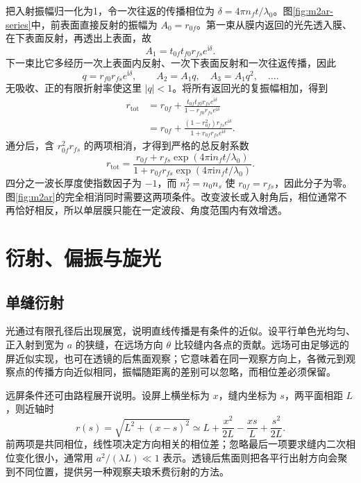 把入射振幅归一化为1，令一次往返的传播相位为
\(\delta=4\pi n_ft/\lambda_0\)。图\ref{fig:m2ar-series}中，前表面直接反射的振幅为
\(A_0=r_{0f}\)。第一束从膜内返回的光先透入膜、在下表面反射，再透出上表面，故
\[
 A_1=t_{0f}t_{f0}r_{fs}e^{\mathrm i\delta}.
\]
下一束比它多经历一次上表面内反射、一次下表面反射和一次往返传播，因此
\[
 q=r_{f0}r_{fs}e^{\mathrm i\delta},\qquad
 A_2=A_1q,\quad A_3=A_1q^2,\quad\ldots.
\]
无吸收、正的有限折射率使这里 \(|q|<1\)。将所有返回光的复振幅相加，得到
\begin{align*}
 r_{\mathrm{tot}}&=r_{0f}+\frac{t_{0f}t_{f0}r_{fs}e^{\mathrm i\delta}}
 {1-r_{f0}r_{fs}e^{\mathrm i\delta}}\\
 &=r_{0f}+\frac{(1-r_{0f}^2)r_{fs}e^{\mathrm i\delta}}
 {1+r_{0f}r_{fs}e^{\mathrm i\delta}}.
\end{align*}
通分后，含 \(r_{0f}^2r_{fs}\) 的两项相消，才得到严格的总反射系数
\[
 r_{\mathrm{tot}}=
 \frac{r_{0f}+r_{fs}\exp(4\pi\mathrm i n_ft/\lambda_0)}
 {1+r_{0f}r_{fs}\exp(4\pi\mathrm i n_ft/\lambda_0)}.
\]
四分之一波长厚度使指数因子为 \(-1\)，而 \(n_f^2=n_0n_s\) 使 \(r_{0f}=r_{fs}\)，因此分子为零。图\ref{fig:m2ar}的完全相消同时需要这两项条件。改变波长或入射角后，相位通常不再恰好相反，所以单层膜只能在一定波段、角度范围内有效增透。

\section{衍射、偏振与旋光}

\subsection{单缝衍射}

光通过有限孔径后出现展宽，说明直线传播是有条件的近似。设平行单色光均匀、正入射到宽为 \(a\) 的狭缝，在远场方向 \(\theta\) 比较缝内各点的贡献。远场可由足够远的屏近似实现，也可在透镜的后焦面观察；它意味着在同一观察方向上，各微元到观察点的传播方向近似相同，振幅随距离的差别可以忽略，而相位差必须保留。

远屏条件还可由路程展开说明。设屏上横坐标为 $x$，缝内坐标为 $s$，两平面相距 $L$，则近轴时
\[
 r(s)=\sqrt{L^2+(x-s)^2}
 \simeq L+\frac{x^2}{2L}-\frac{xs}{L}+\frac{s^2}{2L}.
\]
前两项是共同相位，线性项决定方向相关的相位差；忽略最后一项要求缝内二次相位变化很小，通常用 $a^2/(\lambda L)\ll1$ 表示。透镜后焦面则把各平行出射方向会聚到不同位置，提供另一种观察夫琅禾费衍射的方法。


